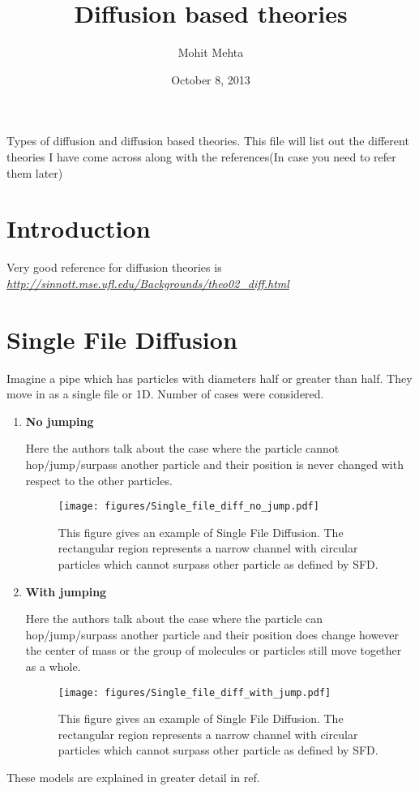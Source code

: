 \documentclass[12pt, oneside]{article}
\begin{document}
\title{Diffusion based theories}
\author{Mohit Mehta}
\date{October 8, 2013}
\maketitle
Types of diffusion and diffusion based theories. This file will list out the different theories I have come across along with the references(In case you need to refer them later) 
\tableofcontents
\newpage
\section{Introduction}
Very good reference for diffusion theories is \textit{\url{http://sinnott.mse.ufl.edu/Backgrounds/theo02_diff.html}}

\section{Single File Diffusion}
Imagine a pipe which has particles with diameters half or greater than half. They move in as a single file or 1D. Number of cases were considered. 

\begin{enumerate}

\item {\bf{No jumping}}

Here the authors talk about the case where the particle cannot hop/jump/surpass another particle and their position is never changed with respect to the other particles.
\begin{figure}[htp!]
\centering 
{\texttt{[image: figures/Single\_file\_diff\_no\_jump.pdf]}} 
\caption{This figure gives an example of Single File Diffusion. The rectangular region represents a narrow channel with circular particles which cannot surpass other particle as defined by SFD.}
\label{fig:SFD_no_jump} 
\end{figure}
\newpage
\item {\bf{With jumping}}

Here the authors talk about the case where the particle can hop/jump/surpass another particle and their position does change however the center of mass or the group of molecules or particles still move together as a whole.
\begin{figure}[htp!]
\centering 
{\texttt{[image: figures/Single\_file\_diff\_with\_jump.pdf]}} 
\caption{This figure gives an example of Single File Diffusion. The rectangular region represents a narrow channel with circular particles which cannot surpass other particle as defined by SFD.}
\label{fig:SFD_with_jump} 
\end{figure}
\end{enumerate}
These models are explained in greater detail in ref. \cite{Hahn1998}
\newpage
 

\end{document}
